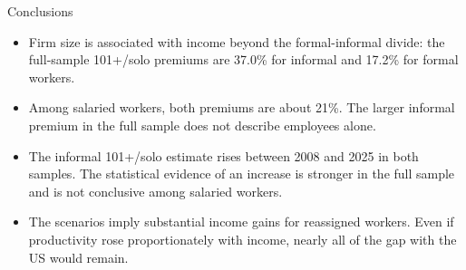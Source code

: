 \begin{frame}{Conclusions}
  \begin{itemize}
    \item Firm size is associated with income beyond the formal-informal divide: the full-sample 101+/solo premiums are 37.0\% for informal and 17.2\% for formal workers.
    \item Among salaried workers, both premiums are about 21\%. The larger informal premium in the full sample does not describe employees alone.
    \item The informal 101+/solo estimate rises between 2008 and 2025 in both samples. The statistical evidence of an increase is stronger in the full sample and is not conclusive among salaried workers.
    \item The scenarios imply substantial income gains for reassigned workers. Even if productivity rose proportionately with income, nearly all of the gap with the US would remain.
  \end{itemize}
\end{frame}
